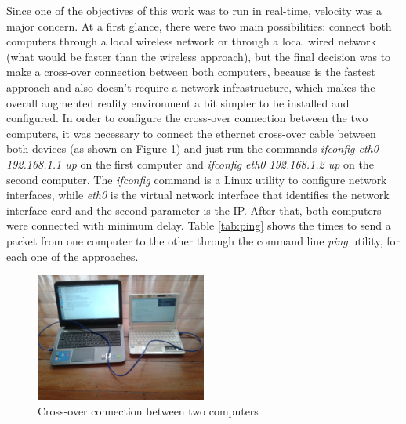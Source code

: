 \documentclass[msc, a4paper, classic, en]{ufbathesis}
\begin{document}
Since one of the objectives of this work was to run in real-time, velocity was a major concern. At a first glance, there were two main possibilities: connect both computers through a local wireless network or through a local wired network (what would be faster than the wireless approach), but the final decision was to make a cross-over connection between both computers, because is the fastest approach and also doesn't require a network infrastructure, which makes the overall augmented reality environment a bit simpler to be installed and configured. In order to configure the cross-over connection between the two computers, it was necessary to connect the ethernet cross-over cable between both devices (as shown on Figure \ref{fig:cross}) and just run the commands \textit{ifconfig eth0 192.168.1.1 up} on the first computer and \textit{ifconfig eth0 192.168.1.2 up} on the second computer. The \textit{ifconfig} command is a Linux utility to configure network interfaces, while \textit{eth0} is the virtual network interface that identifies the network interface card and the second parameter is the IP. After that, both computers were connected with minimum delay. Table \ref{tab:ping} shows the times to send a packet from one computer to the other through the command line \textit{ping} utility, for each one of the approaches.

\begin{figure}
\centering
\includegraphics[width=0.5\textwidth]{images/cross.jpg}
\caption{Cross-over connection between two computers}
\label{fig:cross}
\end{figure}
\end{document}

